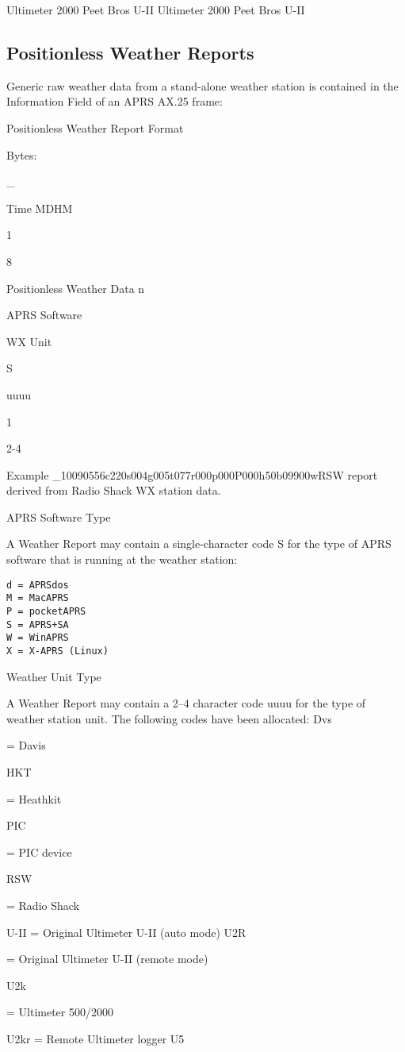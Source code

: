 Ultimeter 2000
Peet Bros U-II
Ultimeter 2000
Peet Bros U-II


\subsection{Positionless Weather Reports}

Generic raw weather data from a stand-alone weather station is contained in
the Information Field of an APRS AX.25 frame:

Positionless Weather Report Format

Bytes:

_

Time
MDHM

1

8

Positionless Weather
Data
n

APRS
Software

WX
Unit

S

uuuu

1

2-4

Example
_10090556c220s004g005t077r000p000P000h50b09900wRSW
report derived from Radio Shack WX station data.

APRS Software Type

A Weather Report may contain a single-character code S for the type of
APRS software that is running at the weather station:
\begin{verbatim}
d = APRSdos
M = MacAPRS
P = pocketAPRS
S = APRS+SA
W = WinAPRS
X = X-APRS (Linux)
\end{verbatim}

Weather Unit
Type

A Weather Report may contain a 2–4 character code uuuu for the type of
weather station unit. The following codes have been allocated:
Dvs

= Davis

HKT

= Heathkit

PIC

= PIC device

RSW

= Radio Shack

U-II = Original Ultimeter U-II (auto mode)
U2R

= Original Ultimeter U-II (remote mode)

U2k

= Ultimeter 500/2000

U2kr = Remote Ultimeter logger
U5


